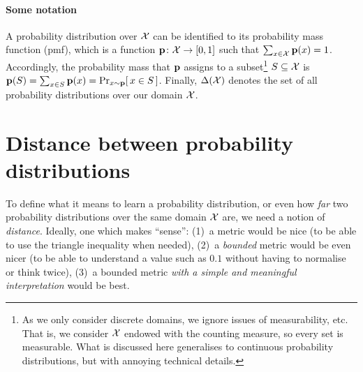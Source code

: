 \paragraph{Some notation} A probability distribution over $\mathcal{X}$ can be identified to its probability mass function (pmf), which is a function $\mathbf{p}\colon\mathcal{X}\to [0,1]$ such that $\sum_{x\in \mathcal{X}}\mathbf{p}(x) = 1$. Accordingly, the probability mass that $\mathbf{p}$ assigns to a subset\footnote{As we only consider discrete domains, we ignore issues of measurability, etc. That is, we consider $\mathcal{X}$ endowed with the counting measure, so every set is measurable. What is discussed here generalises to continuous probability distributions, but with annoying technical details.} $S\subseteq \mathcal{X}$ is $\p(S) = \sum_{x\in S} \p(x) = \probaDistrOf{x\sim\p}{x\in S}$. Finally, $\distribs{\domain}$ denotes the set of all probability distributions over our domain $\mathcal{X}$.

\section{Distance between probability distributions}
To define what it means to learn a probability distribution, or even how \emph{far} two probability distributions over the same domain $\mathcal{X}$ are, we need a notion of \emph{distance}. Ideally, one which makes ``sense'': (1)~a metric would be nice (to be able to use the triangle inequality when needed), (2)~a \emph{bounded} metric would be even nicer (to be able to understand a value such as $0.1$ without having to normalise or think twice), (3)~a bounded metric \emph{with a simple and meaningful interpretation} would be best.

